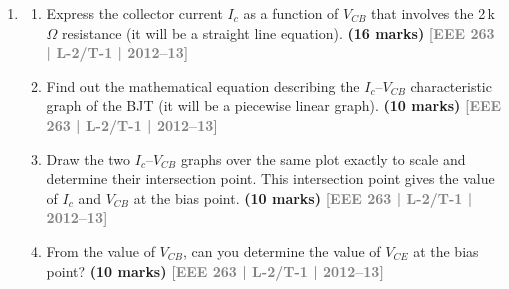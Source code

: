 \documentclass[12pt,a4paper]{article}
\newcommand{\yr}[1]{\hfill\textcolor{gray}{\small\textbf{[#1]}}}
\newcommand{\mk}[1]{\textcolor{orange!70!black}{\small\textbf{(#1 marks)}}}
\begin{document}
\begin{enumerate}
\begin{center}
\end{center}
\mk{20} \yr{EEE 263 | L-2/T-1 | 2020--21}

\item 
\begin{enumerate}

\item Express the collector current $I_c$ as a function of $V_{CB}$ that involves the 2\,k$\Omega$ resistance (it will be a straight line equation).
\mk{16} \yr{EEE 263 | L-2/T-1 | 2012--13}

\item Find out the mathematical equation describing the $I_c$--$V_{CB}$ characteristic graph of the BJT (it will be a piecewise linear graph).
\mk{10} \yr{EEE 263 | L-2/T-1 | 2012--13}

\item Draw the two $I_c$--$V_{CB}$ graphs over the same plot exactly to scale and determine their intersection point. This intersection point gives the value of $I_c$ and $V_{CB}$ at the bias point.
\mk{10} \yr{EEE 263 | L-2/T-1 | 2012--13}

\item From the value of $V_{CB}$, can you determine the value of $V_{CE}$ at the bias point?
\mk{10} \yr{EEE 263 | L-2/T-1 | 2012--13}


\end{enumerate}
\end{enumerate}
\end{document}
